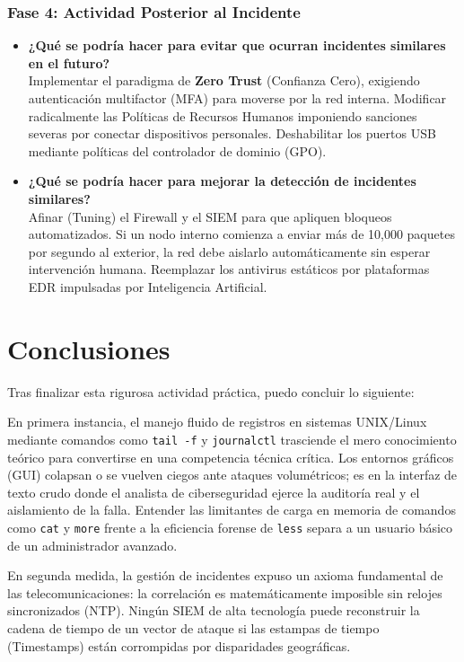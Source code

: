 \documentclass[12pt,a4paper]{article}
\begin{document}
\subsubsection{Fase 4: Actividad Posterior al Incidente}
\begin{itemize}
    \item \textbf{¿Qué se podría hacer para evitar que ocurran incidentes similares en el futuro?}\\
    Implementar el paradigma de \textbf{Zero Trust} (Confianza Cero), exigiendo autenticación multifactor (MFA) para moverse por la red interna. Modificar radicalmente las Políticas de Recursos Humanos imponiendo sanciones severas por conectar dispositivos personales. Deshabilitar los puertos USB mediante políticas del controlador de dominio (GPO).
    \item \textbf{¿Qué se podría hacer para mejorar la detección de incidentes similares?}\\
    Afinar (Tuning) el Firewall y el SIEM para que apliquen bloqueos automatizados. Si un nodo interno comienza a enviar más de 10,000 paquetes por segundo al exterior, la red debe aislarlo automáticamente sin esperar intervención humana. Reemplazar los antivirus estáticos por plataformas EDR impulsadas por Inteligencia Artificial.
\end{itemize}
\newpage

\section{Conclusiones}

Tras finalizar esta rigurosa actividad práctica, puedo concluir lo siguiente:

En primera instancia, el manejo fluido de registros en sistemas UNIX/Linux mediante comandos como \texttt{tail -f} y \texttt{journalctl} trasciende el mero conocimiento teórico para convertirse en una competencia técnica crítica. Los entornos gráficos (GUI) colapsan o se vuelven ciegos ante ataques volumétricos; es en la interfaz de texto crudo donde el analista de ciberseguridad ejerce la auditoría real y el aislamiento de la falla. Entender las limitantes de carga en memoria de comandos como \texttt{cat} y \texttt{more} frente a la eficiencia forense de \texttt{less} separa a un usuario básico de un administrador avanzado.

En segunda medida, la gestión de incidentes expuso un axioma fundamental de las telecomunicaciones: la correlación es matemáticamente imposible sin relojes sincronizados (NTP). Ningún SIEM de alta tecnología puede reconstruir la cadena de tiempo de un vector de ataque si las estampas de tiempo (Timestamps) están corrompidas por disparidades geográficas.
\end{document}
